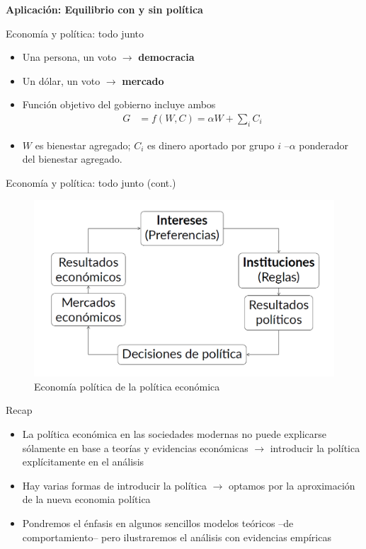 \documentclass[
  ignorenonframetext,
]{beamer}
\providecommand{\tightlist}{%
  \setlength{\itemsep}{0pt}\setlength{\parskip}{0pt}}\usepackage{longtable,booktabs,array}
\begin{document}
\begin{frame}{\textbf{Aplicación: Equilibrio con y sin política}}
\begin{block}{Economía y política: todo junto}
\protect\hypertarget{economuxeda-y-poluxedtica-todo-junto}{}
\begin{itemize}
\tightlist
\item
  Una persona, un voto \(\longrightarrow\) \textbf{democracia}
\item
  Un dólar, un voto \(\longrightarrow\) \textbf{mercado}
\item
  Función objetivo del gobierno incluye ambos \[\begin{aligned}
            G&=f(W,C)=\alpha W+\sum_{i}C_{i}
            \end{aligned}\]
\item
  \(W\) es bienestar agregado; \(C_{i}\) es dinero aportado por grupo
  \(i\) --\(\alpha\) ponderador del bienestar agregado.
\end{itemize}
\end{block}

\begin{block}{Economía y política: todo junto (cont.)}
\protect\hypertarget{economuxeda-y-poluxedtica-todo-junto-cont.}{}
\begin{figure}

{\centering \includegraphics{fig/fig-01-011.png}

}

\caption{Economía política de la política económica}

\end{figure}
\end{block}

\begin{block}{Recap}
\protect\hypertarget{recap}{}
\begin{itemize}
\tightlist
\item
  La política económica en las sociedades modernas no puede explicarse
  sólamente en base a teorías y evidencias económicas
  \(\longrightarrow\) introducir la política explícitamente en el
  análisis
\item
  Hay varias formas de introducir la política \(\longrightarrow\)
  optamos por la aproximación de la nueva economia política
\item
  Pondremos el énfasis en algunos sencillos modelos teóricos --de
  comportamiento-- pero ilustraremos el análisis con evidencias
  empíricas
\end{itemize}
\end{block}
\end{frame}
\end{document}
